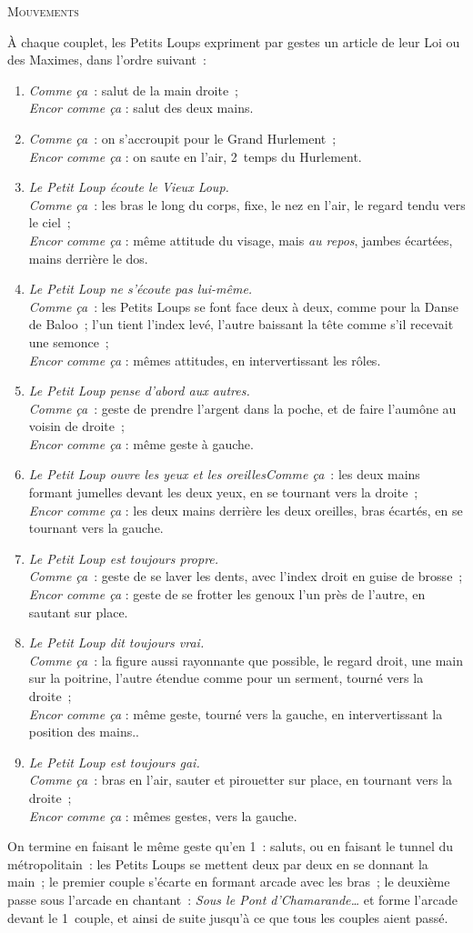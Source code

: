 {\footnotesize

{\centering \textsc{Mouvements}\par}

À chaque couplet, les Petits Loups expriment par gestes un article de leur Loi ou des Maximes, dans l'ordre suivant :

\renewcommand{\couplet}[3][]{%
\item \emph{#1}\emph{Comme ça} : #2 ;\\
\emph{Encor comme ça} : #3.
}

\begin{enumerate}
\couplet{salut de la main droite}{salut des deux mains}
\couplet{on s'accroupit pour le Grand Hurlement}{on saute en l'air, 2\ieme\ temps du Hurlement}
\couplet[Le Petit Loup écoute le Vieux Loup.\\]{les bras le long du corps, fixe, le nez en l'air, le regard tendu vers le ciel}{même attitude du visage, mais \emph{au repos}, jambes écartées, mains derrière le dos}
\couplet[Le Petit Loup ne s'écoute pas lui-même.\\]{les Petits Loups se font face deux à deux, comme pour la Danse de Baloo ; l'un tient l'index levé, l'autre baissant la tête comme s'il recevait une semonce}{mêmes attitudes, en intervertissant les rôles}
\couplet[Le Petit Loup pense d'abord aux autres.\\]{geste de prendre l'argent dans la poche, et de faire l'aumône au voisin de droite}{même geste à gauche}
\couplet[Le Petit Loup ouvre les yeux et les oreilles]{les deux mains formant jumelles devant les deux yeux, en se tournant vers la droite}{les deux mains derrière les deux oreilles, bras écartés, en se tournant vers la gauche}
\couplet[Le Petit Loup est toujours propre.\\]{geste de se laver les dents, avec l'index droit en guise de brosse}{geste de se frotter les genoux l'un près de l'autre, en sautant sur place}
\couplet[Le Petit Loup dit toujours vrai.\\]{la figure aussi rayonnante que possible, le regard droit, une main sur la poitrine, l'autre étendue comme pour un serment, tourné vers la droite}{même geste, tourné vers la gauche, en intervertissant la position des mains.}
\couplet[Le Petit Loup est toujours gai.\\]{bras en l'air, sauter et pirouetter sur place, en tournant vers la droite}{mêmes gestes, vers la gauche}
\end{enumerate}

On termine en faisant le même geste qu'en 1 : saluts, ou en faisant le tunnel du métropolitain : les Petits Loups se mettent deux par deux en se donnant la main ; le premier couple s'écarte en formant arcade avec les bras ; le deuxième passe sous l'arcade en chantant : \emph{Sous le Pont d'Chamarande…} et forme l'arcade devant le 1\ier\ couple, et ainsi de suite jusqu'à ce que tous les couples aient passé.

}
